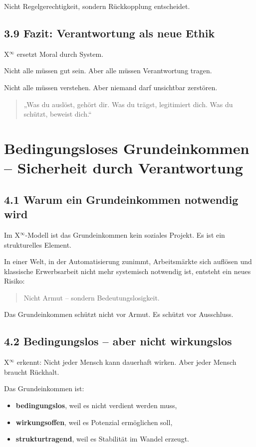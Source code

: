\documentclass[12pt,a4paper]{book}
\begin{document}
Nicht Regelgerechtigkeit, sondern Rückkopplung entscheidet.

\section*{3.9 Fazit: Verantwortung als neue Ethik}

X$^\infty$ ersetzt Moral durch System.

Nicht alle müssen gut sein.  
Aber alle müssen Verantwortung tragen.

Nicht alle müssen verstehen.  
Aber niemand darf unsichtbar zerstören.

\begin{quote}
„Was du auslöst, gehört dir.  
Was du trägst, legitimiert dich.  
Was du schützt, beweist dich.“  
\end{quote}

\chapter{Bedingungsloses Grundeinkommen – Sicherheit durch Verantwortung}

\section*{4.1 Warum ein Grundeinkommen notwendig wird}

Im X$^\infty$-Modell ist das Grundeinkommen kein soziales Projekt.  
Es ist ein strukturelles Element.

In einer Welt, in der Automatisierung zunimmt, Arbeitsmärkte sich auflösen  
und klassische Erwerbsarbeit nicht mehr systemisch notwendig ist,  
entsteht ein neues Risiko:

\begin{quote}
Nicht Armut – sondern Bedeutungslosigkeit.
\end{quote}

Das Grundeinkommen schützt nicht vor Armut.  
Es schützt vor Ausschluss.

\section*{4.2 Bedingungslos – aber nicht wirkungslos}

X$^\infty$ erkennt:  
Nicht jeder Mensch kann dauerhaft wirken. Aber jeder Mensch braucht Rückhalt.

Das Grundeinkommen ist:

\begin{itemize}
  \item \textbf{bedingungslos}, weil es nicht verdient werden muss,
  \item \textbf{wirkungsoffen}, weil es Potenzial ermöglichen soll,
  \item \textbf{strukturtragend}, weil es Stabilität im Wandel erzeugt.
\end{itemize}
\end{document}
